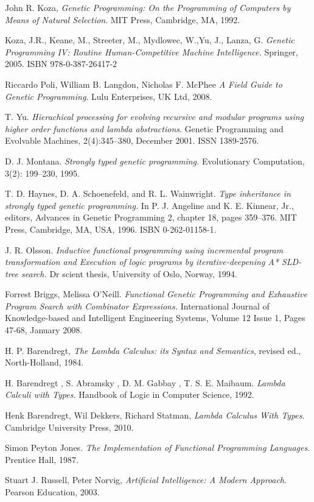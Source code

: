 \documentclass[conference]{IEEEtran}
\begin{document}
\begin{thebibliography}{22}


  John R. Koza,
  \emph{Genetic Programming: On the Programming of Computers by Means of Natural Selection}.
  MIT Press, Cambridge, MA,
  1992. 

  Koza, J.R., Keane, M., Streeter, M., Mydlowec, W.,Yu, J., Lanza, G. 
  \emph{Genetic Programming IV: Routine Human-Competitive Machine Intelligence.} 
  Springer, 2005. ISBN 978-0-387-26417-2 

 Riccardo Poli, William B. Langdon, Nicholas F. McPhee
 \emph{A Field Guide to Genetic Programming}.
 Lulu Enterprises, UK Ltd, 2008.

  T. Yu. 
  \emph{Hierachical processing for evolving recursive and modular 
        programs using higher order functions and lambda abstractions}. 
  Genetic Programming and Evolvable Machines,
  2(4):345–380, December 2001. ISSN 1389-2576.


D. J. Montana. 
\emph{Strongly typed genetic programming.} 
Evolutionary Computation, 3(2): 199–230, 1995.

T. D. Haynes, D. A. Schoenefeld, and R. L. Wainwright. 
\emph{Type inheritance in strongly typed genetic programming.} 
In P. J. Angeline and K. E. Kinnear, Jr., editors, Advances
in Genetic Programming 2, chapter 18, pages 359–376.
MIT Press, Cambridge, MA, USA, 1996. ISBN 0-262-01158-1. 

J. R. Olsson. 
\emph{Inductive functional programming using incremental program 
transformation and Execution of logic programs by 
iterative-deepening A* SLD-tree search.} 
Dr scient thesis, University of Oslo, Norway, 1994.

Forrest Briggs, Melissa O’Neill.
\emph{Functional Genetic Programming and Exhaustive
Program Search with Combinator Expressions.}
International Journal of Knowledge-based and Intelligent Engineering Systems,
Volume 12 Issue 1, Pages 47-68, January 2008. 


H. P. Barendregt,
\emph{The Lambda Calculus: its Syntax and Semantics}, 
revised ed., North-Holland, 1984.

H. Barendregt , S. Abramsky , D. M. Gabbay , T. S. E. Maibaum.
\emph{Lambda Calculi with Types.} 
Handbook of Logic in Computer Science, 1992. 


  Henk Barendregt, Wil Dekkers, Richard Statman,
  \emph{Lambda Calculus With Types}.
  Cambridge University Press,
  2010. 

Simon Peyton Jones. 
\emph{The Implementation of Functional Programming Languages}. 
Prentice Hall, 1987.


	Stuart J. Russell, Peter Norvig,
	\emph{Artificial Intelligence: A Modern Approach}.
	Pearson Education,
	2003. 


\end{thebibliography}

\end{document}

